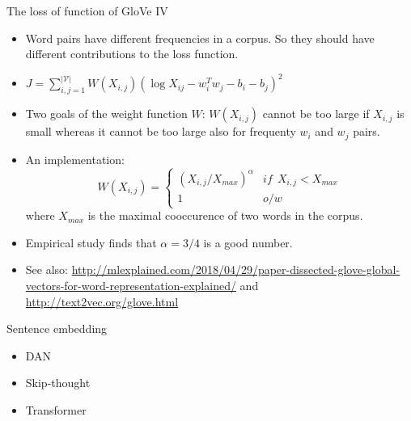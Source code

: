 \documentclass[11pt,handout]{beamer}
\begin{document}
\begin{frame}{The loss of function of GloVe IV}
\begin{itemize}[<+->]
 \item Word pairs have different frequencies in a corpus. So they should have different contributions to the loss function. 
 \item $J = \sum_{i,j= 1}^{|\mathcal{V}|} W(X_{i,j}) (\log X_{ij} - w_i^T w_j - b_i - b_j)^2$
 \item Two goals of the weight function $W$: $W(X_{i,j})$ cannot be too large if $X_{i,j}$ is small whereas it cannot be too large also for frequenty $w_i$ and $w_j$ pairs. 
 \item An implementation: 
 $$W(X_{i,j}) = 
 \begin{cases}
 (X_{i,j} / X_{max})^\alpha & if~~ X_{i,j} < X_{max}\\
 1 & o/w
 \end{cases} $$
 where $X_{max}$ is the maximal cooccurence of two words in the corpus. 
 \item Empirical study finds that $\alpha=3/4$ is a good number. 
  \item See also: \url{http://mlexplained.com/2018/04/29/paper-dissected-glove-global-vectors-for-word-representation-explained/} and \url{http://text2vec.org/glove.html}
\end{itemize}
\end{frame}

\begin{frame}{Sentence embedding}
 \begin{itemize}
  \item DAN
  \item Skip-thought
  \item Transformer 
 \end{itemize}
\end{frame}
\end{document}
